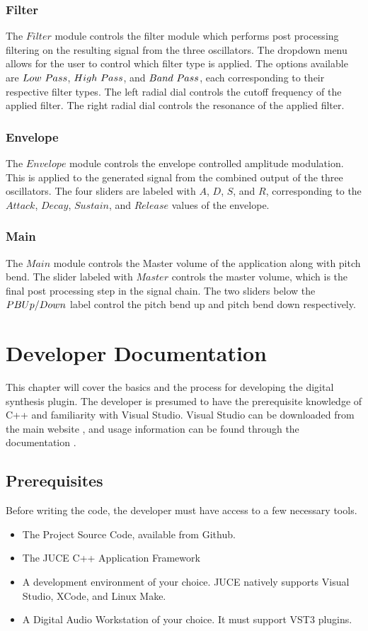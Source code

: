 \documentclass[a4paper,12pt]{report}
\begin{document}
\subsection{Filter}
\label{subsec:filter}
The $Filter$ module controls the filter module which performs post processing filtering on the resulting signal from the three oscillators. The dropdown menu allows for the user to control which filter type is applied. The options available are $Low\ \-Pass$, $High\ \-Pass$, and $Band\ \-Pass$, each corresponding to their respective filter types. The left radial dial controls the cutoff frequency of the applied filter. The right radial dial controls the resonance of the applied filter.

\subsection{Envelope}
\label{subsec:env}
The $Envelope$ module controls the envelope controlled amplitude modulation. This is applied to the generated signal from the combined output of the three oscillators. The four sliders are labeled with $A$, $D$, $S$, and $R$, corresponding to the $Attack$, $Decay$, $Sustain$, and $Release$ values of the envelope.

\subsection{Main}
\label{subsec:main}
The $Main$ module controls the Master volume of the application along with pitch bend. The slider labeled with $Master$ controls the master volume, which is the final post processing step in the signal chain. The two sliders below the $PB \-Up/Down$ label control the pitch bend up and pitch bend down respectively.

\chapter{Developer Documentation}
\label{chapter:devdocs}
This chapter will cover the basics and the process for developing the digital synthesis plugin. The developer is presumed to have the prerequisite knowledge of C++ and familiarity with Visual Studio. Visual Studio can be downloaded from the main website \cite{visualstudio}, and usage information can be found through the documentation \cite{vsdocs}.

\section{Prerequisites}
\label{sec:prereq}
Before writing the code, the developer must have access to a few necessary tools.
\begin{itemize}
\item The Project Source Code, available from Github.
\item The JUCE C++ Application Framework
\item A development environment of your choice. JUCE natively supports Visual Studio, XCode, and Linux Make.
\item A Digital Audio Workstation of your choice. It must support VST3 plugins.
\end{itemize}
\end{document}
